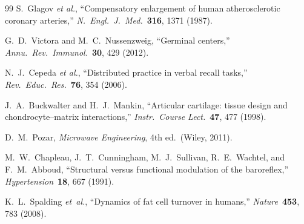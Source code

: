 \documentclass[aps,pre,twocolumn,superscriptaddress,floatfix]{revtex4-2}
\begin{document}
\begin{thebibliography}{99}
S.~Glagov \emph{et al.},
``Compensatory enlargement of human atherosclerotic
coronary arteries,''
\emph{N.\ Engl.\ J.\ Med.}\ \textbf{316}, 1371 (1987).

G.~D.~Victora and M.~C.~Nussenzweig,
``Germinal centers,''
\emph{Annu.\ Rev.\ Immunol.}\ \textbf{30}, 429 (2012).

N.~J.~Cepeda \emph{et al.},
``Distributed practice in verbal recall tasks,''
\emph{Rev.\ Educ.\ Res.}\ \textbf{76}, 354 (2006).

J.~A.~Buckwalter and H.~J.~Mankin,
``Articular cartilage: tissue design and
chondrocyte--matrix interactions,''
\emph{Instr.\ Course Lect.}\ \textbf{47}, 477 (1998).

D.~M.~Pozar,
\emph{Microwave Engineering}, 4th ed.\
(Wiley, 2011).

M.~W.~Chapleau, J.~T.~Cunningham, M.~J.~Sullivan,
R.~E.~Wachtel, and F.~M.~Abboud,
``Structural versus functional modulation of the
baroreflex,''
\emph{Hypertension}\ \textbf{18}, 667 (1991).

K.~L.~Spalding \emph{et~al.},
``Dynamics of fat cell turnover in humans,''
\emph{Nature}\ \textbf{453}, 783 (2008).

\end{thebibliography}
\end{document}
